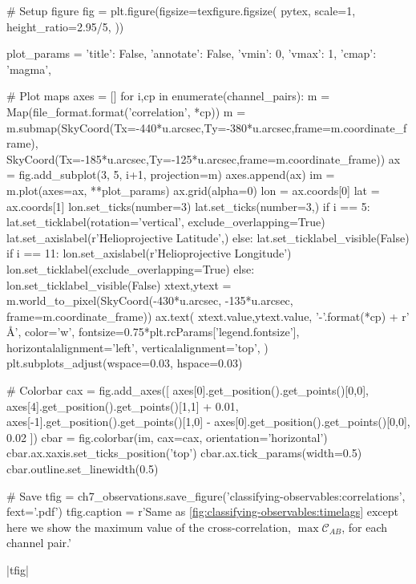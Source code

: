 \begin{pycode}
# Setup figure
fig = plt.figure(figsize=texfigure.figsize(
    pytex,
    scale=1,
    height_ratio=2.95/5,
))

plot_params = {
    'title': False, 
    'annotate': False,
    'vmin': 0,
    'vmax': 1,
    'cmap': 'magma',
}

# Plot maps
axes = []
for i,cp in enumerate(channel_pairs):
    m = Map(file_format.format('correlation', *cp))
    m = m.submap(SkyCoord(Tx=-440*u.arcsec,Ty=-380*u.arcsec,frame=m.coordinate_frame),
                 SkyCoord(Tx=-185*u.arcsec,Ty=-125*u.arcsec,frame=m.coordinate_frame))
    ax = fig.add_subplot(3, 5, i+1, projection=m)
    axes.append(ax)
    im = m.plot(axes=ax, **plot_params)
    ax.grid(alpha=0)
    lon = ax.coords[0]
    lat = ax.coords[1]
    lon.set_ticks(number=3)
    lat.set_ticks(number=3,) 
    if i == 5:
        lat.set_ticklabel(rotation='vertical', exclude_overlapping=True)
        lat.set_axislabel(r'Helioprojective Latitude',)
    else:
        lat.set_ticklabel_visible(False)
    if i == 11:
        lon.set_axislabel(r'Helioprojective Longitude')
        lon.set_ticklabel(exclude_overlapping=True)
    else:
        lon.set_ticklabel_visible(False)
    xtext,ytext = m.world_to_pixel(SkyCoord(-430*u.arcsec, -135*u.arcsec, frame=m.coordinate_frame))
    ax.text(
        xtext.value,ytext.value,
        '{}-{}'.format(*cp) + r' \si{\angstrom}',
        color='w',
        fontsize=0.75*plt.rcParams['legend.fontsize'],
        horizontalalignment='left',
        verticalalignment='top',
    )
plt.subplots_adjust(wspace=0.03, hspace=0.03)

# Colorbar
cax = fig.add_axes([
    axes[0].get_position().get_points()[0,0],
    axes[4].get_position().get_points()[1,1] + 0.01,
    axes[-1].get_position().get_points()[1,0] - axes[0].get_position().get_points()[0,0], 
    0.02
])
cbar = fig.colorbar(im, cax=cax, orientation='horizontal')
cbar.ax.xaxis.set_ticks_position('top')
cbar.ax.tick_params(width=0.5)
cbar.outline.set_linewidth(0.5)

# Save
tfig = ch7_observations.save_figure('classifying-observables:correlations', fext='.pdf')
tfig.caption = r'Same as \autoref{fig:classifying-observables:timelags} except here we show the maximum value of the cross-correlation, $\max\mathcal{C}_{AB}$, for each channel pair.'
\end{pycode}
|tfig|

